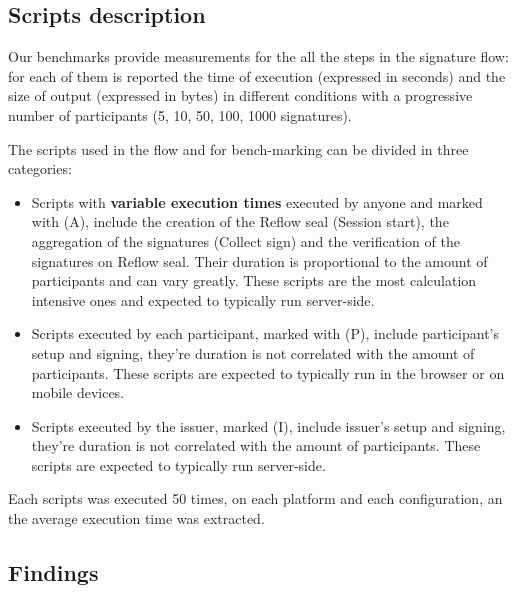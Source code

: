 \documentclass[twocolumn]{article}
\begin{document}
\subsection*{Scripts description}

Our benchmarks provide measurements for the all the steps in the signature flow: for each of them is reported the time of execution (expressed in seconds) and the size of output (expressed in bytes) in different conditions with a progressive number of participants (5, 10, 50, 100, 1000 signatures).

The scripts used in the flow and for bench-marking can be divided in three categories: 

\begin{itemize}
\item Scripts with \textbf{variable execution times} executed by anyone and marked with (A), include the creation of the Reflow seal (Session start), the aggregation of the signatures (Collect sign) and the verification of the signatures on Reflow seal. Their duration is proportional to the amount of participants and can vary greatly. These scripts are the most calculation intensive ones and expected to typically run server-side.

\item Scripts executed by each participant, marked with (P), include participant's setup and signing, they're duration is not correlated with the amount of participants. These scripts are expected to typically run in the browser or on mobile devices.

\item Scripts executed by the issuer, marked (I), include issuer's setup and signing, they're duration is not correlated with the amount of participants. These scripts are expected to typically run server-side.
\end{itemize}

Each scripts was executed 50 times, on each platform and each configuration, an the average execution time was extracted.



\subsection*{Findings}
\end{document}
